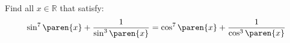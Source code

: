 Find all $x \in \mathbb{R}$ that satisfy:
\begin{equation*}
  \sin^7\paren{x} + \frac{1}{\sin^3\paren{x}} =
  \cos^7\paren{x} + \frac{1}{\cos^3\paren{x}}
\end{equation*}
